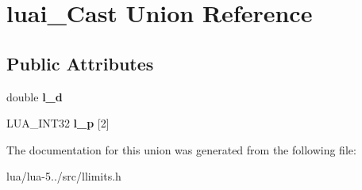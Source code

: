 \hypertarget{unionluai___cast}{\section{luai\+\_\+\+Cast Union Reference}
\label{unionluai___cast}
}
\subsection*{Public Attributes}
\begin{DoxyCompactItemize}
\item 
\hypertarget{unionluai___cast_a4c7b565f84bb2a8c1a1ce74bedc49c65}{double {\bfseries l\+\_\+d}}\label{unionluai___cast_a4c7b565f84bb2a8c1a1ce74bedc49c65}

\item 
\hypertarget{unionluai___cast_a8188efa1c19a2b288d47e5ef72329dfa}{L\+U\+A\+\_\+\+I\+N\+T32 {\bfseries l\+\_\+p} \mbox{[}2\mbox{]}}\label{unionluai___cast_a8188efa1c19a2b288d47e5ef72329dfa}

\end{DoxyCompactItemize}


The documentation for this union was generated from the following file\+:\begin{DoxyCompactItemize}
\item 
lua/lua-\/5../src/llimits.\+h\end{DoxyCompactItemize}
